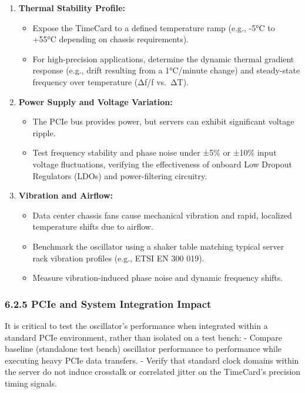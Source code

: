 \documentclass[
]{article}
\begin{document}
\begin{enumerate}
\item
  \textbf{Thermal Stability Profile:}

  \begin{itemize}
  \item
    Expose the TimeCard to a defined temperature ramp (e.g., -5°C to
    +55°C depending on chassis requirements).
  \item
    For high-precision applications, determine the dynamic thermal
    gradient response (e.g., drift resulting from a 1°C/minute change)
    and steady-state frequency over temperature (Δf/f vs.~ΔT).
  \end{itemize}
\item
  \textbf{Power Supply and Voltage Variation:}

  \begin{itemize}
  \item
    The PCIe bus provides power, but servers can exhibit significant
    voltage ripple.
  \item
    Test frequency stability and phase noise under ±5\% or ±10\% input
    voltage fluctuations, verifying the effectiveness of onboard Low
    Dropout Regulators (LDOs) and power-filtering circuitry.
  \end{itemize}
\item
  \textbf{Vibration and Airflow:}

  \begin{itemize}
  \item
    Data center chassis fans cause mechanical vibration and rapid,
    localized temperature shifts due to airflow.
  \item
    Benchmark the oscillator using a shaker table matching typical
    server rack vibration profiles (e.g., ETSI EN 300 019).
  \item
    Measure vibration-induced phase noise and dynamic frequency shifts.
  \end{itemize}
\end{enumerate}

\subsubsection{6.2.5 PCIe and System Integration
Impact}\label{pcie-and-system-integration-impact}

It is critical to test the oscillator's performance when integrated
within a standard PCIe environment, rather than isolated on a test
bench: - Compare baseline (standalone test bench) oscillator performance
to performance while executing heavy PCIe data transfers. - Verify that
standard clock domains within the server do not induce crosstalk or
correlated jitter on the TimeCard's precision timing signals.
\end{document}
